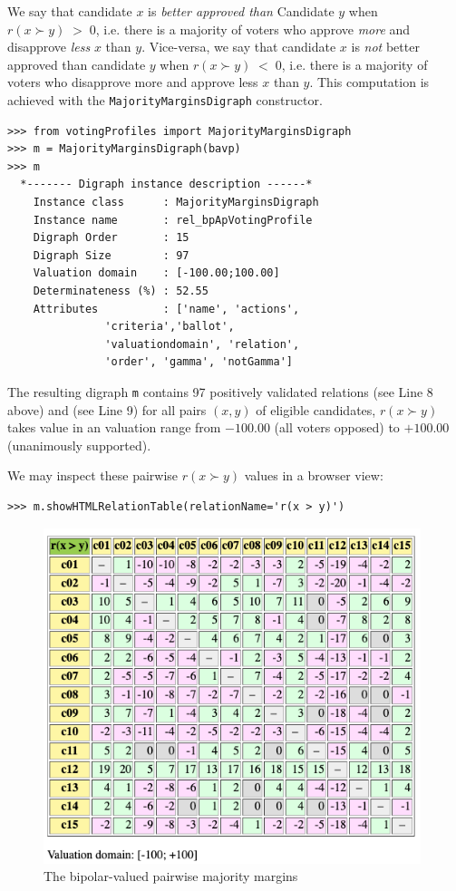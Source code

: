 We say that candidate $x$ is \emph{better approved than} Candidate $y$ when $r(x \succ y)\;>\;0$, i.e. there is a majority of voters who approve \emph{more} and disapprove \emph{less} $x$ than $y$. Vice-versa, we say that candidate $x$ is \emph{not} better approved than candidate $y$ when $r(x \succ y)\;<\;0$, i.e. there is a majority of voters who disapprove more and approve less $x$ than $y$. This computation is achieved with the \texttt{MajorityMarginsDigraph} constructor.
\begin{lstlisting}
>>> from votingProfiles import MajorityMarginsDigraph
>>> m = MajorityMarginsDigraph(bavp)
>>> m
  *------- Digraph instance description ------*
    Instance class      : MajorityMarginsDigraph
    Instance name       : rel_bpApVotingProfile
    Digraph Order       : 15
    Digraph Size        : 97
    Valuation domain    : [-100.00;100.00]
    Determinateness (%) : 52.55
    Attributes          : ['name', 'actions',
               'criteria','ballot',
               'valuationdomain', 'relation',
               'order', 'gamma', 'notGamma']
\end{lstlisting}
The resulting digraph \texttt{m} contains 97 positively validated relations (see Line 8 above) and (see Line 9) for all pairs $(x,y)$ of eligible candidates, $r(x \succ y)$ takes value in an valuation range from $-100.00$ (all voters opposed) to $+100.00$ (unanimously supported).

We may inspect these pairwise $r(x \succ y)$ values in a browser view: 
\begin{lstlisting}
>>> m.showHTMLRelationTable(relationName='r(x > y)')
\end{lstlisting}
\begin{figure}[h]
\includegraphics[width=11cm]{Figures/20-3-majMargAV.png}
\caption{The bipolar-valued pairwise majority margins} 
\label{fig:20.3}       %
\end{figure}

